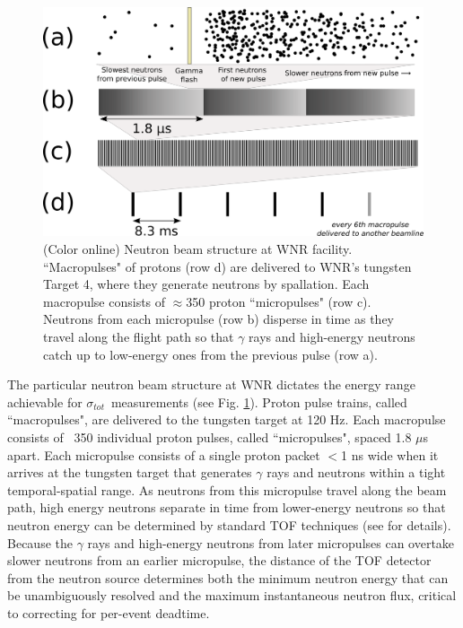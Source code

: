 \documentclass[twocolumn,secnumarabic,amssymb, nobibnotes, aps, prl,
superscriptaddress, nobalancelastpage]{revtex4}
\newcommand{\tot}{\ensuremath{\sigma_{tot}}}
\begin{document}
\begin{figure}
    \includegraphics[scale=0.4]{figures/beamStructure.png}
    \caption{(Color online) Neutron beam structure at WNR facility.
        ``Macropulses" of protons (row d) are delivered to
        WNR's tungsten Target 4, where they generate neutrons by spallation.
        Each macropulse consists of
        $\approx$350 proton ``micropulses" (row c). Neutrons
        from each micropulse (row b) disperse in
        time as they travel along the flight path so that $\gamma$ rays and high-energy 
    neutrons catch up to low-energy ones from the previous pulse (row a).}
    \label{BeamStructure}
\end{figure}

The particular neutron beam structure at WNR dictates the energy range
achievable for \tot\ measurements (see Fig. \ref{BeamStructure}).
Proton pulse trains, called ``macropulses", are delivered to the tungsten target at 120 Hz.
Each macropulse consists of ~350 individual proton pulses, called ``micropulses", spaced 1.8 
$\mu$s apart. Each micropulse consists of a single proton packet $<$1 ns wide when it 
arrives at the tungsten target that generates $\gamma$ rays and neutrons within a tight
temporal-spatial range. As neutrons from this micropulse travel along the beam path, 
high energy neutrons separate in time from lower-energy neutrons so that neutron
energy can be determined by standard TOF techniques (see \cite{Moore1980} for details).
Because the $\gamma$ rays and high-energy neutrons from later micropulses can
overtake slower neutrons from an earlier micropulse, the distance of the TOF
detector from the neutron source determines both the minimum neutron energy that can be 
unambiguously resolved and the maximum instantaneous neutron flux, critical to correcting
for per-event deadtime.
\end{document}
